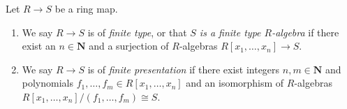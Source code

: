 \begin{definition}
\label{definition-finite-type}
Let $R \to S$ be a ring map.
\begin{enumerate}
\item We say $R \to S$ is of {\it finite type}, or that {\it $S$ is a finite
type $R$-algebra} if there exist an $n \in \mathbf{N}$ and a surjection
of $R$-algebras $R[x_1, \ldots, x_n] \to S$.
\item We say $R \to S$ is of {\it finite presentation} if there
exist integers $n, m \in \mathbf{N}$ and polynomials
$f_1, \ldots, f_m \in R[x_1, \ldots, x_n]$
and an isomorphism of $R$-algebras
$R[x_1, \ldots, x_n]/(f_1, \ldots, f_m) \cong S$.
\end{enumerate}
\end{definition}
